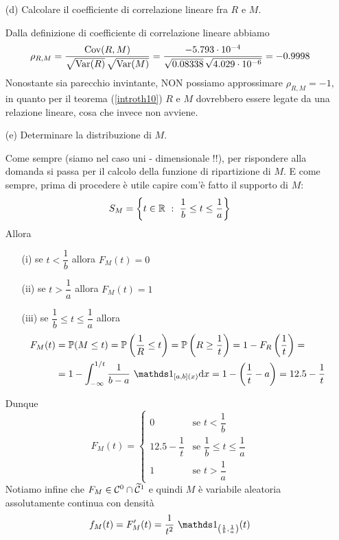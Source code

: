 \begin{enumerate}
\item [(d)] Calcolare il coefficiente di correlazione lineare fra $R$ e $M$.

Dalla definizione di coefficiente di correlazione lineare abbiamo
\[
\rho_{R,M}=\frac{\operatorname{Cov}(R,M)}{\sqrt{\operatorname{Var}(R)}\,\sqrt{\operatorname{Var}(M)}}=\frac{-5.793\cdot 10^{-4}}{\sqrt{0.08338}\,\sqrt{4.029\cdot 10^{-6}}}=-0.9998
\]
Nonostante sia parecchio invintante, NON possiamo approssimare $\rho_{R,M}=-1$, in quanto per il teorema (\ref{introth10}) $R$ e $M$ dovrebbero essere legate da una relazione lineare, cosa che invece non avviene.

\item [(e)] Determinare la distribuzione di $M$.

Come sempre (siamo nel caso uni - dimensionale !!), per rispondere alla domanda si passa per il calcolo della funzione di ripartizione di $M$. E come sempre, prima di procedere è utile capire com'è fatto il supporto di $M$:
\[
S_M=\left\{ t\in\mathbb{R}\ :\ \frac{1}{b}\leq t\leq\frac{1}{a}  \right\}
\]
Allora
\begin{enumerate}
\item [(i)] se $t<\dfrac{1}{b}$ allora $F_M(t)=0$

\item [(ii)] se $t>\dfrac{1}{a}$ allora $F_M(t)=1$

\item [(iii)] se $\dfrac{1}{b}\leq t\leq\dfrac{1}{a}$ allora
\begin{gather*}
\begin{aligned}
F_M(t)&=\PP(M\leq t)=\PP\left(\frac{1}{R}\leq t\right)=\PP\left(R\geq\frac{1}{t}\right)=1-F_R\left(\frac{1}{t}\right)=\\
&=1-\int_{-\infty}^{1/t}\frac{1}{b-a}\ \Ind_{[a,b](x)}\dx=1-\left(\frac{1}{t}-a\right)=12.5-\frac{1}{t}
\end{aligned}
\end{gather*}
\end{enumerate}
Dunque
\[
F_M(t)=
\begin{cases}
0                               &\text{se }t<\dfrac{1}{b} \\
12.5-\dfrac{1}{t}        &\text{se } \dfrac{1}{b}\leq t\leq \dfrac{1}{a}  \\
1                               &\text{se }t>\dfrac{1}{a}
\end{cases}
\]
Notiamo infine che $F_M\in\mathcal{C}^0\cap\widetilde{\mathcal{C}}^1$ e quindi $M$ è variabile aleatoria assolutamente continua con densità
\[
f_M(t)=F_M'(t)=\frac{1}{t^2}\ \Ind_{\left(\frac{1}{b},\frac{1}{a}\right)}(t)
\]


\end{enumerate}
